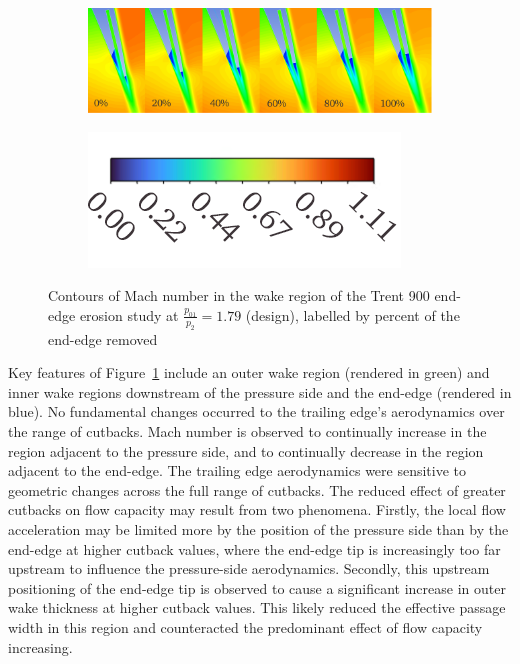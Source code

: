 \documentclass[a4paper, 11pt, oneside]{report}
\begin{document}
\begin{figure}[H]
	\centering
	\begin{subfigure}{.9\textwidth}
		\centering
		\includegraphics[width=\linewidth]{figs/ss_cutbacks_wakes_design_pr.png}
	\end{subfigure}
	\begin{subfigure}{.4\textwidth}
		\centering
		\includegraphics[width=\linewidth]{figs/mach_legend_design_horizontal.png}
	\end{subfigure}
	\caption{Contours of Mach number in the wake region of the Trent 900 end-edge erosion study at $\frac{p_{01}}{p_2}=1.79$ (design), labelled by percent of the end-edge removed}
      \label{fig:ss_cutbacks_wakes_design_pr}
\end{figure}

Key features of Figure~\ref{fig:ss_cutbacks_wakes_design_pr} include an outer wake region (rendered in green) and inner wake regions downstream of the pressure side and the end-edge (rendered in blue). No fundamental changes occurred to the trailing edge's aerodynamics over the range of cutbacks. Mach number is observed to continually increase in the region adjacent to the pressure side, and to continually decrease in the region adjacent to the end-edge. The trailing edge aerodynamics were sensitive to geometric changes across the full range of cutbacks. The reduced effect of greater cutbacks on flow capacity may result from two phenomena. Firstly, the local flow acceleration may be limited more by the position of the pressure side than by the end-edge at higher cutback values, where the end-edge tip is increasingly too far upstream to influence the pressure-side aerodynamics. Secondly, this upstream positioning of the end-edge tip is observed to cause a significant increase in outer wake thickness at higher cutback values. This likely reduced the effective passage width in this region and counteracted the predominant effect of flow capacity increasing.
\end{document}
